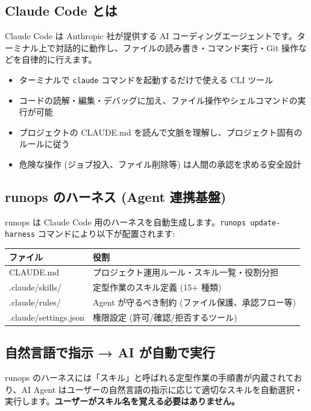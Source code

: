 \documentclass[a4paper,11pt]{article}
\begin{document}
\subsection*{\color{accent} Claude Code とは}

Claude Code は Anthropic 社が提供する AI コーディングエージェントです。ターミナル上で対話的に動作し、ファイルの読み書き・コマンド実行・Git 操作などを自律的に行えます。

\begin{itemize}[nosep]
  \item ターミナルで \texttt{claude} コマンドを起動するだけで使える CLI ツール
  \item コードの読解・編集・デバッグに加え、ファイル操作やシェルコマンドの実行が可能
  \item プロジェクトの CLAUDE.md を読んで文脈を理解し、プロジェクト固有のルールに従う
  \item 危険な操作 (ジョブ投入、ファイル削除等) は人間の承認を求める安全設計
\end{itemize}

\subsection*{\color{accent} runops のハーネス (Agent 連携基盤)}

runops は Claude Code 用のハーネスを自動生成します。\texttt{runops update-harness} コマンドにより以下が配置されます:

\begin{center}
\begin{tabular}{ll}
\toprule
\textbf{ファイル} & \textbf{役割} \\
\midrule
CLAUDE.md & プロジェクト運用ルール・スキル一覧・役割分担 \\
.claude/skills/ & 定型作業のスキル定義 (15+ 種類) \\
.claude/rules/ & Agent が守るべき制約 (ファイル保護、承認フロー等) \\
.claude/settings.json & 権限設定 (許可/確認/拒否するツール) \\
\bottomrule
\end{tabular}
\end{center}

\subsection*{\color{accent} 自然言語で指示 → AI が自動で実行}

runops のハーネスには「スキル」と呼ばれる定型作業の手順書が内蔵されており、AI Agent はユーザーの自然言語の指示に応じて適切なスキルを自動選択・実行します。\textbf{ユーザーがスキル名を覚える必要はありません。}
\end{document}
